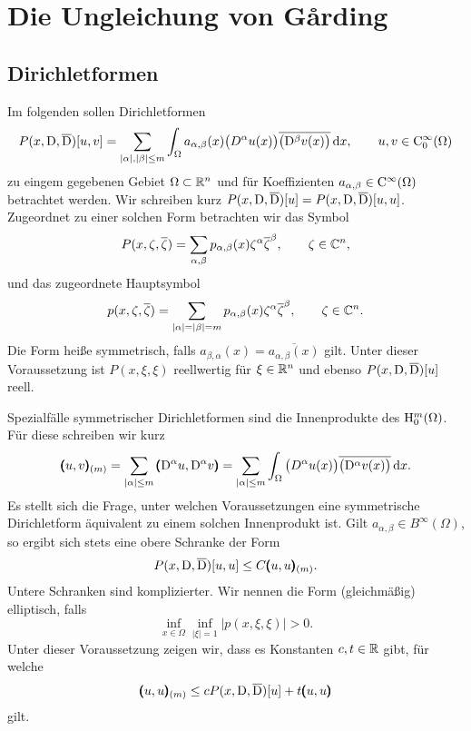 \chapter{Die Ungleichung von G\r{a}rding}
\cite{Garding:1953}
\cite{Lax:1966}

\section{Dirichletformen}
Im folgenden sollen Dirichletformen 
\begin{equation}
   P(x,\mathrm D,\overline{\mathrm D})[u,v] = \sum_{|\alpha|,|\beta|\le m} \int_\Omega a_{\alpha,\beta}(x) \big(D^\alpha u(x)\big) \overline{\big(\mathrm D^\beta v(x)\big)} \,\mathrm d x,\qquad u,v\in\mathrm C_0^\infty(\Omega)
\end{equation}
zu eingem gegebenen Gebiet $\Omega\subset\mathbb R^n$ und für Koeffizienten $a_{\alpha,\beta}\in\mathrm C^\infty(\Omega)$ betrachtet werden. Wir schreiben kurz 
$P(x,\mathrm D,\overline{\mathrm D})[u]=P(x,\mathrm D,\overline{\mathrm D})[u,u]$. Zugeordnet zu einer solchen Form betrachten wir das Symbol
\begin{equation}
   P(x,\zeta,\overline\zeta) = \sum_{\alpha,\beta} p_{\alpha,\beta}(x) \zeta^\alpha\overline\zeta^\beta,\qquad \zeta\in\mathbb C^n,
\end{equation}
und das zugeordnete Hauptsymbol
\begin{equation}
   p(x,\zeta,\overline\zeta) = \sum_{|\alpha|=|\beta|=m} p_{\alpha,\beta}(x) \zeta^\alpha\overline\zeta^\beta,\qquad \zeta\in\mathbb C^n.
\end{equation}
Die Form heiße symmetrisch, falls $a_{\beta,\alpha}(x)=\overline{a_{\alpha,\beta}(x)}$ gilt. Unter dieser Voraussetzung ist $P(x,\xi,\xi)$ reellwertig f\"ur $\xi\in\mathbb R^n$
und ebenso $P(x,\mathrm D,\overline {\mathrm D})[u]$ reell. 

Spezialfälle symmetrischer Dirichletformen sind die Innenprodukte des $\mathrm H^m_0(\Omega)$. Für diese schreiben wir kurz
\begin{equation}
  \pmb(u,v\pmb)_{(m)} = \sum_{|\alpha|\le m} \pmb(\mathrm D^\alpha u,\mathrm D^\alpha v\pmb) = \sum_{|\alpha|\le m} \int_\Omega   \big(D^\alpha u(x)\big) \overline{\big(\mathrm D^\alpha v(x)\big)} \,\mathrm d x.
\end{equation}
Es stellt sich die Frage, unter welchen Voraussetzungen eine symmetrische Dirichletform äquivalent zu einem solchen Innenprodukt ist. Gilt $a_{\alpha,\beta}\in B^\infty(\Omega)$, so ergibt sich stets eine obere Schranke der Form
\begin{equation}
    P(x,\mathrm D,\overline{\mathrm D})[u,u] \le C \pmb(u,u\pmb)_{(m)}.
\end{equation}
Untere Schranken sind komplizierter. Wir nennen die Form (gleichmäßig) elliptisch, falls 
\begin{equation}
  \inf_{x\in\Omega}  \inf_{|\xi|=1} |p(x,\xi,\xi)| > 0.
\end{equation}
Unter dieser Voraussetzung zeigen wir, dass es Konstanten $c,t\in\mathbb R$ gibt, für welche
\begin{equation} 
   \pmb(u,u\pmb)_{(m)} \le c P(x,\mathrm D,\overline {\mathrm D}) [u] + t \pmb(u,u\pmb)
\end{equation}
gilt.

